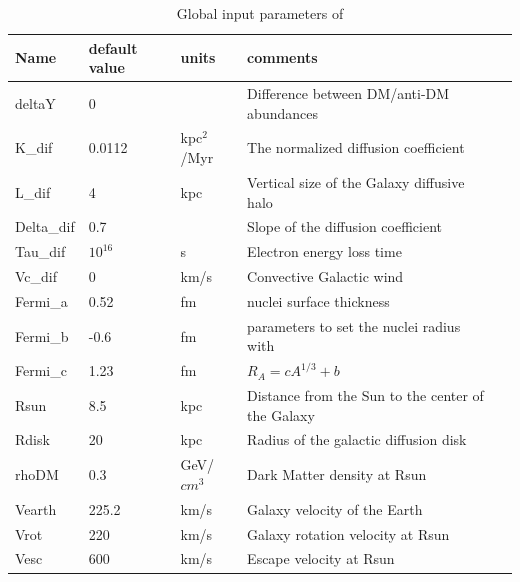 \documentclass[12pt,a4paper]{article}
\begin{document}
\begin{table}[htbp]
 \caption{Global input parameters of \micro}
 \label{paramTab}
\begin{center}
\begin{tabular}{|l|l|l|l|l|}
\hline
  Name      &default value & units &  comments \\  \hline
  deltaY     &  0          &           & Difference between DM/anti-DM abundances\\
K\_dif      & 0.0112     & kpc$^2$/Myr & The normalized diffusion coefficient\\
L\_dif      & 4           & kpc       & Vertical size of the Galaxy diffusive halo \\
Delta\_dif   & 0.7        &           &Slope of the diffusion coefficient\\ 
Tau\_dif    & $10^{16}$   &   s       &Electron energy loss time\\
Vc\_dif     & 0           &  km/s     &  Convective Galactic wind \\
Fermi\_a    &  0.52        &  fm   & nuclei  surface thickness \\
Fermi\_b    &  -0.6        &  fm   &  parameters to set the nuclei radius with  \\    
Fermi\_c    &  1.23        &  fm   &  $R_A=c A^{1/3} +b$ \\ 
Rsun        & 8.5          & kpc   & Distance from the Sun to the center of the Galaxy\\
Rdisk       & 20           & kpc   & Radius of the galactic diffusion disk \\
rhoDM       &  0.3         & GeV/$cm^3$ & Dark Matter density at Rsun\\
Vearth      &  225.2   & km/s     & Galaxy velocity of the Earth     \\
Vrot       &  220   & km/s     & Galaxy rotation velocity at Rsun     \\
Vesc     &  600   & km/s     & Escape velocity at Rsun     \\
\hline
\end{tabular}
\end{center}
\end{table}
\end{document}
